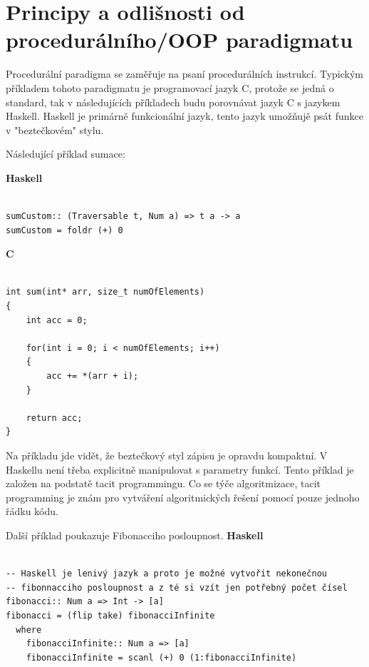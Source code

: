 \documentclass[male,czech]{kithesis}
\begin{document}
\section{Principy a odlišnosti od procedurálního/OOP paradigmatu}

Procedurální paradigma se zaměřuje na psaní procedurálních instrukcí.
Typickým příkladem tohoto paradigmatu je programovací jazyk C, 
protože se jedná o standard, 
tak v následujících příkladech budu porovnávat jazyk C s jazykem Haskell.
Haskell je primárně funkcionální jazyk, 
tento jazyk umožňujě psát funkce v "beztečkovém" stylu. 

Následující příklad sumace:

\textbf{Haskell}
\begin{verbatim}

sumCustom:: (Traversable t, Num a) => t a -> a
sumCustom = foldr (+) 0

\end{verbatim}

\textbf{C}
\begin{verbatim}

int sum(int* arr, size_t numOfElements)
{
    int acc = 0;
    
    for(int i = 0; i < numOfElements; i++)
    {
        acc += *(arr + i);
    }
    
    return acc;
}

\end{verbatim}
Na příkladu jde vidět, 
že beztečkový styl zápisu je opravdu kompaktní. 
V Haskellu není třeba explicitně manipulovat s parametry funkcí.
Tento příklad je založen na podstatě tacit programmingu.
Co se týče algoritmizace, 
tacit programming je znám pro vytváření algoritmických řešení pomocí pouze jednoho řádku kódu. 

Další příklad poukazuje Fibonacciho posloupnost.
\textbf{Haskell}
\begin{verbatim}

-- Haskell je lenivý jazyk a proto je možné vytvořit nekonečnou 
-- fibonnacciho posloupnost a z té si vzít jen potřebný počet čísel 
fibonacci:: Num a => Int -> [a]
fibonacci = (flip take) fibonacciInfinite
  where
    fibonacciInfinite:: Num a => [a]
    fibonacciInfinite = scanl (+) 0 (1:fibonacciInfinite)

\end{verbatim}

\end{document}
